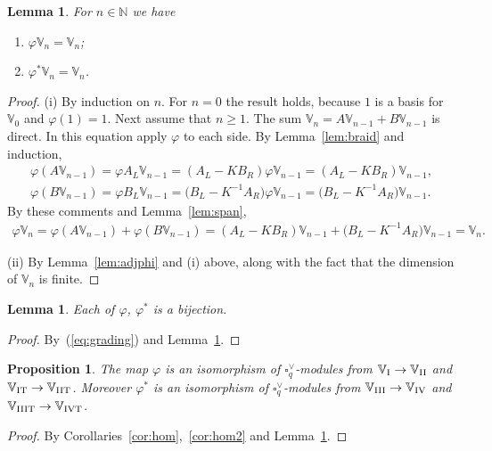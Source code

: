 \documentclass[pdftex]{sigma}
\numberwithin{equation}{section}
\newtheorem{Lemma}[Theorem]{Lemma}
\newtheorem{Proposition}[Theorem]{Proposition}
 { \theoremstyle{definition}
\newtheorem{Definition}[Theorem]{Definition}
\newtheorem{Example}[Theorem]{Example}
\newtheorem{Note}[Theorem]{Note}
}
\begin{document}
\begin{Lemma}\label{lem:qroot}For $n \in \mathbb N$ we have
\begin{enumerate}\itemsep=0pt
\item[\rm (i)]
 $\varphi \mathbb V_n = \mathbb V_n$;
\item[\rm (ii)]
 $\varphi^* \mathbb V_n = \mathbb V_n$.
 \end{enumerate}
\end{Lemma}
\begin{proof}(i) By induction on $n$. For $n=0$ the result holds, because $1$ is a basis for $\mathbb V_0$ and $\varphi(1)=1$. Next assume that $n\geq 1$. The sum $\mathbb V_n= A \mathbb V_{n-1} + B \mathbb V_{n-1}$ is direct. In this equation apply $\varphi$ to each side. By Lemma~\ref{lem:braid} and induction,
\begin{gather*}
\varphi (A \mathbb V_{n-1})=\varphi A_L \mathbb V_{n-1}= (A_L - K B_R)\varphi \mathbb V_{n-1}
= (A_L - K B_R)\mathbb V_{n-1}, \\
\varphi (B \mathbb V_{n-1}) =\varphi B_L \mathbb V_{n-1} = \big(B_L - K^{-1} A_R\big)\varphi \mathbb V_{n-1}
= \big(B_L - K^{-1} A_R\big)\mathbb V_{n-1}.
\end{gather*}
By these comments and Lemma~\ref{lem:span},
\begin{gather*}
\varphi \mathbb V_n =\varphi (A \mathbb V_{n-1}) + \varphi (B \mathbb V_{n-1})
= (A_L - K B_R)\mathbb V_{n-1} +\big(B_L - K^{-1} A_R\big)\mathbb V_{n-1} = \mathbb V_n.
\end{gather*}

(ii) By Lemma~\ref{lem:adjphi} and (i) above, along with the fact that the dimension of $\mathbb V_n$ is finite.
\end{proof}

\begin{Lemma}\label{lem:bij}Each of $\varphi$, $\varphi^*$ is a bijection.
\end{Lemma}
\begin{proof}By~(\ref{eq:grading}) and Lemma~\ref{lem:qroot}.
\end{proof}

\begin{Proposition}\label{prop:expand}The map $\varphi$ is an isomorphism of $\square^\vee_q$-modules from
$\mathbb V_{\rm I} \to \mathbb V_{\rm II}$ and $\mathbb V_{\rm IT} \to\mathbb V_{\rm IIT}$. Moreover $\varphi^*$ is an isomorphism of $\square^\vee_q$-modules from $\mathbb V_{\rm III} \to \mathbb V_{\rm IV}$ and $\mathbb V_{\rm IIIT} \to \mathbb V_{\rm IVT}$.
\end{Proposition}
\begin{proof} By Corollaries~\ref{cor:hom},~\ref{cor:hom2} and Lemma~\ref{lem:bij}.
\end{proof}
\end{document}
